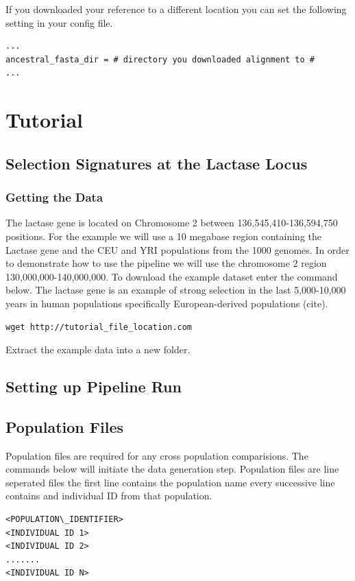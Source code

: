 \documentclass[a4paper,10pt]{article}
\begin{document}
If you downloaded your reference to a different location you can set the following setting in your config file.\\
\begin{verbatim}
...
ancestral_fasta_dir = # directory you downloaded alignment to #
...
\end{verbatim}

\section{Tutorial}
\subsection{Selection Signatures at the Lactase Locus}
\subsubsection{Getting the Data}
The lactase gene is located on Chromosome 2 between 136,545,410-136,594,750 positions. For the example we will use a 10 megabase region containing the Lactase gene and the CEU and YRI populations from the 1000 genomes. In order to demonstrate how to use the pipeline we will use the chromosome 2 region 130,000,000-140,000,000. To download the example dataset enter the command below. The lactase gene is an example of strong selection in the last 5,000-10,000 years in human populations specifically European-derived populations (cite).  \\

\begin{verbatim}
wget http://tutorial_file_location.com 
\end{verbatim}

Extract the example data into a new folder.

\subsection{Setting up Pipeline Run}
\subsection{Population Files}
Population files are required for any cross population comparisions. The commands below will initiate the data generation step. Population files are line seperated files the first line contains the population name every successive line contains and individual ID from that population.\\
\begin{verbatim}
<POPULATION\_IDENTIFIER>
<INDIVIDUAL ID 1>
<INDIVIDUAL ID 2>
.......
<INDIVIDUAL ID N>
\end{verbatim}
\end{document}
